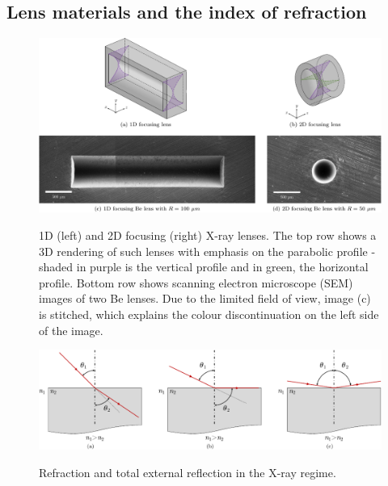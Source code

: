 \begin{refsection}
\subsection{Lens materials and the index of refraction}\label{sec:interaction_with_matter}
\begin{figure}[t]
    \centering
    {\includegraphics[width=.75\linewidth]{figures/compressed/1D2D.pdf}}
    \caption[1D and 2D focusing X-ray lenses]{1D (left) and 2D focusing (right) X-ray lenses. The top row shows a 3D rendering of such lenses with emphasis on the parabolic profile - shaded in purple is the vertical profile and in green, the horizontal profile. Bottom row shows scanning electron microscope (SEM) images of two Be lenses. Due to the limited field of view, image (c) is stitched, which explains the colour discontinuation on the left side of the image.} 
    \label{fig:1D2D_lenses}
\end{figure}
\begin{figure}[t]
    \centering
    {\includegraphics[width=0.75\linewidth]{figures/ch03/reflection_refraction.pdf}}
    \caption[Refraction and total external reflection in the X-ray regime]{Refraction and total external reflection in the X-ray regime.}
    \label{fig:reflection_refraction}
\end{figure}

\end{refsection}
